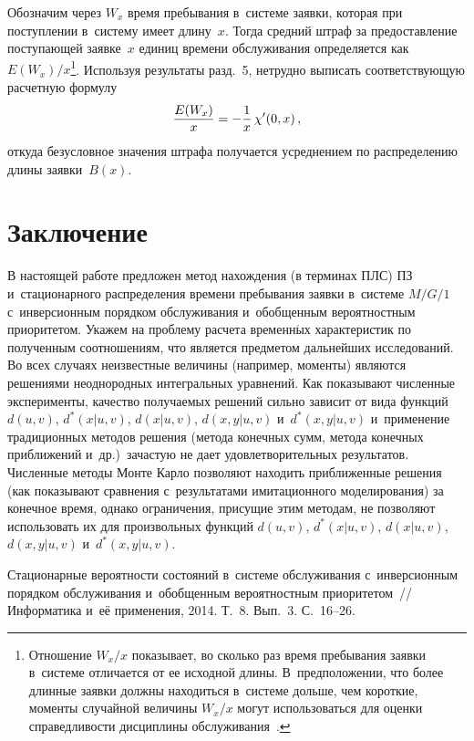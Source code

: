 \begin{multicols}{2}
Обозначим через $W_x$ время пребывания в~системе заявки, которая при
поступлении в~систему имеет длину~$x$. Тогда средний штраф за
предоставление поступающей заявке~$x$ единиц времени обслуживания
определяется как $E(W_x)/x$\footnote{Отношение $W_x/x$ показывает, во
сколько раз время пребывания заявки в~системе отличается от ее
исходной длины. В~предположении, что более длинные заявки должны
находиться в~системе дольше, чем короткие, моменты случайной
величины $W_x/x$ могут использоваться для оценки справедливости
дисциплины обслуживания~\cite{klein, avi}.}. Используя
результаты разд.~5, нетрудно выписать соответствующую расчетную
формулу
$$
\displaystyle\frac{\displaystyle E(W_x)\mathstrut}{\displaystyle x\mathstrut} =- \displaystyle\frac{\displaystyle 1\mathstrut}{\displaystyle x\mathstrut}\, \chi'(0,x)\,,
$$
откуда безусловное значения штрафа получается
усреднением по распределению длины заявки~$B(x)$.

\section{Заключение}

В настоящей работе предложен метод нахождения (в терминах ПЛС)
ПЗ и~стационарного распределения времени пребывания заявки в~системе $M/G/1$ с~инверсионным порядком обслуживания и~обобщенным
вероятностным приоритетом. Укажем на проблему расчета временн$\acute{\mbox{ы}}$х характеристик по полученным соотношениям, что
является предметом дальнейших исследований.
Во всех случаях неизвестные величины (например, моменты)
являются решениями неоднородных интегральных уравнений.
Как показывают численные эксперименты,
качество получаемых решений сильно зависит от вида
функций $d(u,v)$, $d^*(x|u,v)$, $d(x|u,v)$, $d(x,y|u,v)$ и~$d^*(x,y|u,v)$
и~применение традиционных методов решения (метода
конечных сумм, метода конечных приближений и~др.)\
за\-час\-тую не дает удовлетворительных результатов.
Чис\-лен\-ные методы Мон\-те Кар\-ло позволяют находить приближенные решения (как
показывают сравнения с~результатами имитационного моделирования)
за конечное время, однако ограничения, присущие этим методам,
не позволяют использовать их для произвольных функций $d(u,v)$, $d^*(x|u,v)$,
$d(x|u,v)$, $d(x,y|u,v)$ и~$d^*(x,y|u,v)$.

{\small\frenchspacing
 {%
 \begin{thebibliography}{99}

Стационарные вероятности состояний в~системе обслуживания с~инверсионным порядком обслуживания и~обобщенным вероятностным приоритетом~// Информатика и~её применения, 2014. Т.~8. Вып.~3. С.~16--26.


\end{thebibliography}}}
\end{multicols}
